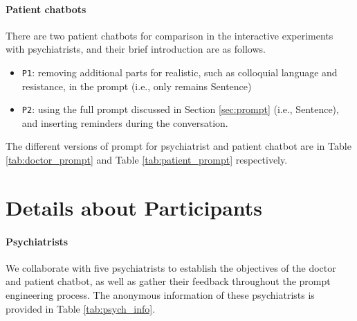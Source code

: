 \paragraph{Patient chatbots}
There are two patient chatbots for comparison in the interactive experiments with psychiatrists, and their brief introduction are as follows.
\begin{itemize}
    \item \texttt{P1}: removing additional parts for realistic, such as colloquial language and resistance, in the prompt (i.e., only remains Sentence)
    \item \texttt{P2}: 
    using the full prompt discussed in Section \ref{sec:prompt} (i.e., Sentence), and inserting reminders during the conversation.
\end{itemize}

The different versions of prompt for psychiatrist and patient chatbot are in Table \ref{tab:doctor_prompt} and Table \ref{tab:patient_prompt} respectively.

\section{Details about Participants}
\label{apd:psych_info}
\paragraph{Psychiatrists}
We collaborate with five psychiatrists to establish the objectives of the doctor and patient chatbot, as well as gather their feedback throughout the prompt engineering process. The anonymous information of these psychiatrists is provided in Table \ref{tab:psych_info}.

